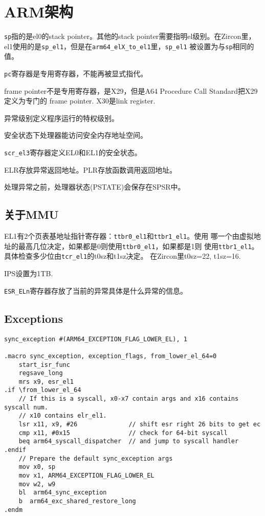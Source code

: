 \section{ARM架构}

\verb!sp!指的是el0的stack pointer。其他的stack pointer需要指明el级别。在Zircon里，
el1使用的是\verb!sp_el1!，但是在\verb!arm64_elX_to_el1!里，\verb!sp_el1!
被设置为与\verb!sp!相同的值。

\verb!pc!寄存器是专用寄存器，不能再被显式指代。

frame pointer不是专用寄存器，是X29，但是A64 Procedure Call Standard把X29定义为专门的
frame pointer. X30是link register.

异常级别定义程序运行的特权级别。

安全状态下处理器能访问安全内存地址空间。

\verb!scr_el3!寄存器定义EL0和EL1的安全状态。

ELR存放异常返回地址。PLR存放函数调用返回地址。

处理异常之前，处理器状态(PSTATE)会保存在SPSR中。

\subsection{关于MMU}

EL1有2个页表基地址指针寄存器：\verb!ttbr0_el1!和\verb!ttbr1_el1!。使用
哪一个由虚拟地址的最高几位决定，如果都是0则使用\verb!ttbr0_el1!，如果都是1则
使用\verb!ttbr1_el1!。具体检查多少位由\verb!tcr_el1!的t0sz和t1sz决定。
在Zircon里t0sz=22, t1sz=16.

IPS设置为1TB.

\verb!ESR_ELn!寄存器存放了当前的异常具体是什么异常的信息。

\subsection{Exceptions}
\begin{verbatim}
sync_exception #(ARM64_EXCEPTION_FLAG_LOWER_EL), 1

.macro sync_exception, exception_flags, from_lower_el_64=0
    start_isr_func
    regsave_long
    mrs x9, esr_el1
.if \from_lower_el_64
    // If this is a syscall, x0-x7 contain args and x16 contains syscall num.
    // x10 contains elr_el1.
    lsr x11, x9, #26              // shift esr right 26 bits to get ec
    cmp x11, #0x15                // check for 64-bit syscall
    beq arm64_syscall_dispatcher  // and jump to syscall handler
.endif
    // Prepare the default sync_exception args
    mov x0, sp
    mov x1, ARM64_EXCEPTION_FLAG_LOWER_EL
    mov w2, w9
    bl  arm64_sync_exception
    b  arm64_exc_shared_restore_long
.endm
\end{verbatim}